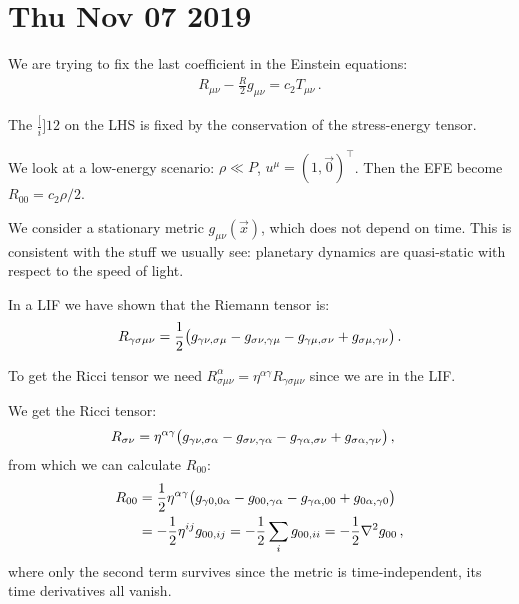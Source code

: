 \documentclass[main.tex]{subfiles}
\begin{document}
\section*{Thu Nov 07 2019}

We are trying to fix the last coefficient in the Einstein equations: 
%
\begin{align}
  R_{\mu \nu } - \frac{R}{2} g_{ \mu \nu } = c_2 T_{\mu \nu }
\,.
\end{align}

The \(\frac[i]{1}{2} \) on the LHS is fixed by the conservation of the stress-energy tensor.

We look at a low-energy scenario: \(\rho \ll P\), \(u^{\mu } = (1, \vec{0})^\top\). Then the EFE become \(R_{00} = c_2 \rho /2\).

We consider a stationary metric \(g_{\mu \nu } (\vec{x})\), which does not depend on time. This is consistent with the stuff we usually see: planetary dynamics are quasi-static with respect to the speed of light.

In a LIF we have shown that the Riemann tensor is:
%
\begin{align}
  R_{\gamma \sigma \mu \nu } = \frac{1}{2} \qty(g_{\gamma \nu , \sigma \mu } - g_{\sigma \nu , \gamma \mu } - g_{\gamma \mu , \sigma \nu } + g_{\sigma \mu , \gamma \nu })
\,.
\end{align}

To get the Ricci tensor we need \(R^{\alpha }_{\sigma \mu \nu } = \eta^{\alpha \gamma }R_{\gamma \sigma \mu \nu }\) since we are in the LIF.

We get the Ricci tensor:
%
\begin{align}
  R_{\sigma \nu } &=  \eta^{\alpha \gamma } \qty(g_{\gamma \nu , \sigma \alpha } - g_{\sigma \nu , \gamma \alpha } - g_{\gamma \alpha , \sigma \nu } + g_{\sigma \alpha , \gamma \nu })
\,,
\end{align}
%
from which we can calculate \(R_{00}\):
%
\begin{align}
    R_{0 0 } &= \frac{1}{2} \eta^{\alpha \gamma } \qty(g_{\gamma 0 , 0 \alpha } - g_{0 0 , \gamma \alpha } - g_{\gamma \alpha , 0 0 } + g_{0 \alpha , \gamma 0 })  \\
    &= -\frac{1}{2}\eta^{i j }g_{00, ij} 
    = - \frac{1}{2} \sum _{i} g_{00, ii} = -\frac{1}{2} \nabla^2 g_{00}
    \,,
\end{align}
%
where only the second term survives since the metric is time-independent, its time derivatives all vanish.
\end{document}
